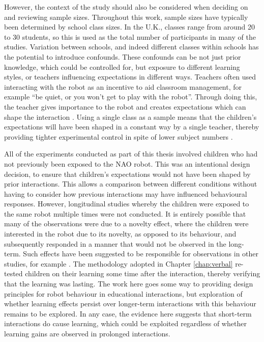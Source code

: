 However, the context of the study should also be considered when deciding on and reviewing sample sizes. Throughout this work, sample sizes have typically been determined by school class sizes. In the U.K., classes range from around 20 to 30 students, so this is used as the total number of participants in many of the studies. Variation between schools, and indeed different classes within schools has the potential to introduce confounds. These confounds can be not just prior knowledge, which could be controlled for, but exposure to different learning styles, or teachers influencing expectations in different ways. Teachers often used interacting with the robot as an incentive to aid classroom management, for example ``be quiet, or you won't get to play with the robot''. Through doing this, the teacher gives importance to the robot and creates expectations which can shape the interaction \citep{fischer2014initiating}. Using a single class as a sample means that the children's expectations will have been shaped in a constant way by a single teacher, thereby providing tighter experimental control in spite of lower subject numbers \citep{baxter2015wider}.

All of the experiments conducted as part of this thesis involved children who had not previously been exposed to the NAO robot. This was an intentional design decision, to ensure that children's expectations would not have been shaped by prior interactions. This allows a comparison between different conditions without having to consider how previous interactions may have influenced behavioural responses. However, longitudinal studies whereby the children were exposed to the same robot multiple times were not conducted. It is entirely possible that many of the observations were due to a novelty effect, where the children were interested in the robot due to its novelty, as opposed to its behaviour, and subsequently responded in a manner that would not be observed in the long-term. Such effects have been suggested to be responsible for observations in other studies, for example \citet{kanda2004interactive,sung2009robots}. The methodology adopted in Chapter \ref{chap:verbal} re-tested children on their \gls{learning} some time after the interaction, thereby verifying that the \gls{learning} was lasting. The work here goes some way to providing design principles for robot behaviour in educational interactions, but exploration of whether \gls{learning} effects persist over longer-term interactions with this behaviour remains to be explored. In any case, the evidence here suggests that short-term interactions do cause \gls{learning}, which could be exploited regardless of whether \gls{learning} gains are observed in prolonged interactions.


